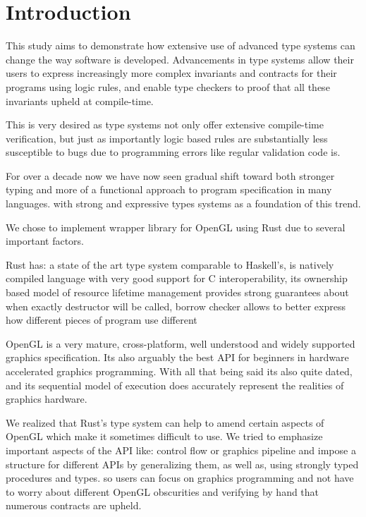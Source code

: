 \chapter*{Introduction}

This study aims to demonstrate how extensive use of advanced type systems can change the way software is developed.
Advancements in type systems allow their users to express increasingly more complex invariants and contracts for their programs using logic rules, 
and enable type checkers to proof that all these invariants upheld at compile-time.

This is very desired as type systems not only offer extensive compile-time verification, but just as importantly logic based rules are substantially less susceptible to bugs
due to programming errors like regular validation code is.

For over a decade now we have now seen gradual shift toward both stronger typing and more of a functional approach to program specification in many languages.
with strong and expressive types systems as a foundation of this trend.

We chose to implement wrapper library for OpenGL using Rust due to several important factors.

Rust has: a state of the art type system comparable to Haskell's, 
is natively compiled language with very good support for C interoperability,
its ownership based model of resource lifetime management provides strong guarantees about when exactly destructor will be called,
borrow checker allows to better express how different pieces of program use different 

OpenGL is a very mature, cross-platform, well understood and widely supported graphics specification.
Its also arguably the best API for beginners in hardware accelerated graphics programming.
With all that being said its also quite dated, and its sequential model of execution does accurately represent the realities of graphics hardware.

We realized that Rust's type system can help to amend certain aspects of OpenGL which make it sometimes difficult to use.
We tried to emphasize important aspects of the API like: control flow or graphics pipeline and 
impose a structure for different APIs by generalizing them, as well as, using strongly typed procedures and types.
so users can focus on graphics programming and not have to worry about different OpenGL obscurities and verifying by hand that 
numerous contracts are upheld.
